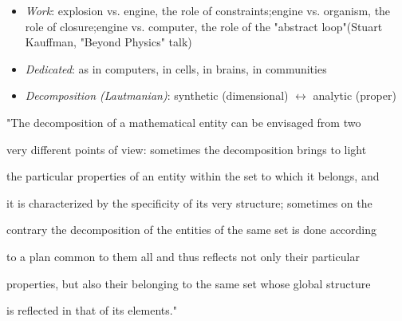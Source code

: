 \documentclass[a4paper,10pt]{article}
\begin{document}
\begin{itemize}
\item \textcolor{energyorange}{\emph{Work}}: explosion vs. engine, the role of constraints;\newline engine vs. organism, the role of closure;\newline engine vs. computer, the role of the "abstract loop"\newline (Stuart Kauffman, "Beyond Physics" talk)
\item \textcolor{dedicationmagenta}{\emph{Dedicated}}: as in computers, in cells, in brains, in communities
\item \textcolor{decompositionocean}{\emph{Decomposition (Lautmanian)}}: synthetic (dimensional) \ensuremath{\longleftrightarrow} analytic (proper)
\end{itemize}
"The decomposition of a mathematical entity can be envisaged from two\par
very different points of view: sometimes the decomposition brings to light\par
the particular properties of an entity within the set to which it belongs, and\par
it is characterized by the specificity of its very structure; sometimes on the\par
contrary the decomposition of the entities of the same set is done according\par
to a plan common to them all and thus reflects not only their particular\par
properties, but also their belonging to the same set whose global structure\par
is reflected in that of its elements."\par
\end{document}

